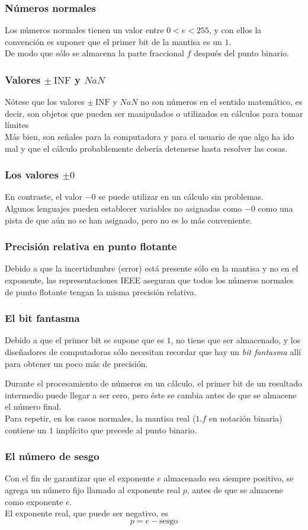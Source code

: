 \begin{frame}
\frametitle{Números normales}
Los números normales tienen un valor entre $0 < e < 255$, y con ellos la convención es suponer que el primer bit de la mantisa es un $1$.
\\
\bigskip
De modo que sólo se almacena la parte fraccional $f$ después del punto binario. 
\end{frame}
\begin{frame}
\frametitle{Valores $\pm \: \text{INF}$ y $NaN$ }
Nótese que los valores $\pm \: \text{INF}$ y $NaN$ no son números en el sentido matemático, es decir, son objetos que pueden ser manipulados o utilizados en cálculos para tomar límites
\\
\bigskip
Más bien, son señales para la computadora y para el usuario de que algo ha ido mal y que el cálculo probablemente debería detenerse hasta resolver las cosas.
\end{frame}
\begin{frame}
\frametitle{Los valores $\pm 0$}
En contraste, el valor $-0$ se puede utilizar en un cálculo sin problemas.
\\
\bigskip
Algunos lenguajes pueden establecer variables no asignadas como $-0$ como una pista de que aún no se han asignado, pero no es lo más conveniente.
\end{frame}
\begin{frame}
\frametitle{Precisión relativa en punto flotante}
Debido a que la incertidumbre (error) está presente sólo en la mantisa y no en el exponente, las representaciones IEEE aseguran que todos los números normales de punto flotante tengan la misma precisión relativa.
\end{frame}
\begin{frame}
\frametitle{El bit fantasma}
Debido a que el primer bit se supone que es $1$, no tiene que ser almacenado, y los diseñadores de computadoras sólo necesitan recordar que hay un \emph{bit fantasma} allí para obtener un poco más de precisión.
\end{frame}
\begin{frame}
Durante el procesamiento de números en un cálculo, el primer bit de un resultado intermedio puede llegar a ser cero, pero éste se cambia antes de que se almacene el número final.
\\
\bigskip
Para repetir, en los casos normales, la mantisa real ($1.f$ en notación binaria) contiene un $1$ implícito que precede al punto binario.
\end{frame}
\begin{frame}
\frametitle{El número de sesgo}
Con el fin de garantizar que el exponente $e$ almacenado sea siempre positivo, se agrega un número fijo llamado  al exponente real $p$, antes de que se almacene como exponente $e$.
\\
\bigskip
El exponente real, que puede ser negativo, es
\begin{equation}
p = e - \text{sesgo}
\label{eq:ecuacion_01_03}
\end{equation}
\end{frame}
